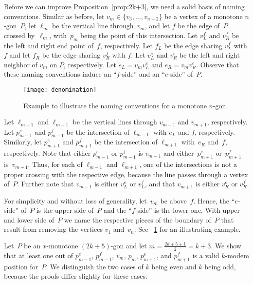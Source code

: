 \documentclass[A4]{article}
\begin{document}
Before we can improve Proposition~\ref{prop:2k+3}, we need a solid basis of naming conventions.
Similar as before, let $v_m\in\{v_3,\ldots,v_{n-2}\}$ be a vertex of a monotone $n$-gon~$P$, let $\ell_m$ be the vertical line through~$v_m$, and let $f$ be the edge of~$P$ crossed by~$\ell_m$, with~$p_m$ being the point of this intersection.
Let $v^{f}_{L}$ and $v^{f}_{R}$ be the left and right end point of~$f$, respectively.
Let $f_L$ be the edge sharing $v^{f}_{L}$ with $f$ and let $f_R$ be the edge sharing $v^{f}_{R}$ with $f$.
Let $v^e_L$ and $v^e_R$ be the left and right neighbor of $v_m$ on $P$, respectively.
Let $e_L=v_m v^e_L$ and $e_R=v_m v^e_R$.
Observe that these naming conventions induce an ``$f$-side'' and an ``$e$-side'' of~$P$.

\begin{figure}[htb]
  \centering
  \texttt{[image: denomination]}
  \caption{Example to illustrate the naming conventions for a monotone $n$-gon.}
  \label{fig:naming_convention}
\end{figure}

Let $\ell_{m-1}$ and $\ell_{m+1}$ be the vertical lines through $v_{m-1}$ and $v_{m+1}$, respectively.
Let $p^e_{m-1}$ and $p^f_{m-1}$ be the intersection of $\ell_{m-1}$ with $e_L$ and $f$, respectively.
Similarly, let $p^e_{m+1}$ and $p^f_{m+1}$ be the intersection of $\ell_{m+1}$ with~$e_R$ and~$f$, respectively.
Note that either $p^e_{m-1}$ or $p^f_{m-1}$ is $v_{m-1}$ and either~$p^e_{m+1}$ or~$p^f_{m+1}$ is~$v_{m+1}$.
Thus, for each of $\ell_{m-1}$ and $\ell_{m+1}$, one of the intersections is not a proper crossing with the respective edge, because the line passes through a vertex of~$P$.
Further note that $v_{m-1}$ is either $v^e_L$ or $v^{f}_{L}$, and that $v_{m+1}$ is either $v^e_R$ or $v^{f}_{R}$.

For simplicity and without loss of generality, let~$v_m$ be above~$f$.
Hence, the ``$e$-side'' of~$P$ is the upper side of~$P$ and the ``$f$-side'' is the lower one.
With upper and lower side of~$P$ we name the respective pieces of the boundary of~$P$ that result from removing the vertices $v_1$ and~$v_n$.
See \figurename~\ref{fig:naming_convention} for an illustrating example.


Let~$P$ be an $x$-monotone $(2k+5)$-gon and let $m=\frac{2k+5+1}{2}=k+3$.
We show that at least one out of $p^e_{m-1}$, $p^f_{m-1}$, $v_{m}$, $p_{m}$, $p^e_{m+1}$, and $p^f_{m+1}$ is a valid \mbox{$k$-modem} position for~$P$.
We distinguish the two cases of $k$ being even and $k$ being odd, because the proofs differ slightly for these cases.
\end{document}
